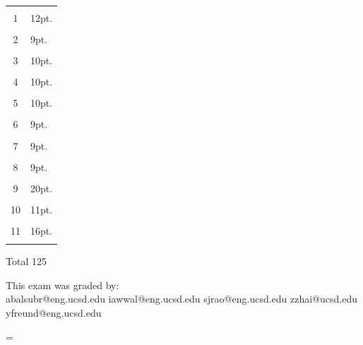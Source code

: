 \documentclass[10pt,dvips]{amsart}
\begin{document}
\begin{center}
\begin{tabular}{|c|l|} \hline
\hspace{1in} & \hspace{1in} \\
1 & 12pt. \\ 
&  \\ \hline
2 & 9pt. \\
&  \\ \hline
3 & 10pt. \\
&  \\ \hline
4 & 10pt.\\
&  \\ \hline
5 & 10pt.\\
&  \\ \hline
6 & 9pt.\\
&  \\ \hline
7 & 9pt.\\
&  \\ \hline
8 & 9pt.\\
&  \\ \hline
9 & 20pt. \\
& \\ \hline
10 & 11pt. \\
& \\ \hline
11 & 16pt. \\
& \\ \hline
\end{tabular}
\end{center}
\begin{center}Total 125\end{center}

\vspace{0.2in}

This exam was graded by:\\
\hspace{1cm}abalsubr@eng.ucsd.edu
\hspace{1cm}iawwal@eng.ucsd.edu
\hspace{1cm}sjrao@eng.ucsd.edu
\hspace{1cm}zzhai@ucsd.edu
\hspace{1cm}yfreund@eng.ucsd.edu


\pagebreak

\columnwidth=\linewidth
\end{document}
